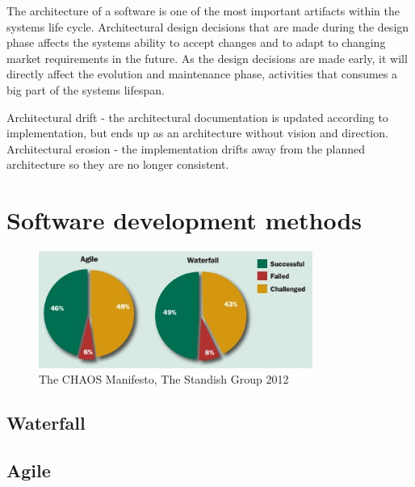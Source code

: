 The architecture of a software is one of the most important artifacts within the systems life cycle\cite{Bass:2012:SAP:2392670,knodel2006static}. Architectural design decisions that are made during the design phase affects the systems ability to accept changes and to adapt to changing market requirements in the future. As the design decisions are made early, it will directly affect the evolution and maintenance phase\cite{Pressman:2009:SEP:1593949}, activities that consumes a big part of the systems lifespan\cite{Vliet:2008:SEP:1481475}. 

Architectural drift - the architectural documentation is updated according to implementation, but ends up as an architecture without vision and direction.
Architectural erosion - the implementation drifts away from the planned architecture so they are no longer consistent. 




\section{Software development methods} %

\begin{figure}
	\centering
	\includegraphics[width=0.8\textwidth]{images/Agile-Waterfall-Success-Failure-Rates.jpg}
	\caption{The CHAOS Manifesto, The Standish Group 2012}
	\label{fig:agileWaterfallSuccessFailureRates}
\end{figure}



\subsection{Waterfall}

\subsection{Agile}


